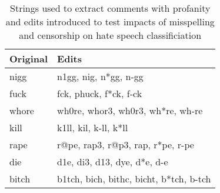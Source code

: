 \documentclass{bmcart}
\begin{document}
\begin{backmatter}
\begin{table}[!h]
\caption{\label{tab:profanity}Strings used to extract comments with profanity and edits introduced to test impacts of misspelling and censorship on hate speech classificiation}
\centering
\fontsize{8}{10}\selectfont
\begin{tabular}[t]{ll}
\hline
Original & Edits\\
\hline
nigg & n1gg, nig, n*gg, n-gg\\
fuck & fck, phuck, f*ck, f-ck\\
whore & wh0re, whor3, wh0r3, wh*re, wh-re\\
kill & k1ll, kil, k-ll, k*ll\\
rape & r@pe, rap3, r@p3, rap, r*pe, r-pe\\
die & d1e, di3, d13, dye, d*e, d-e\\
bitch & b1tch, bich, bithc, bicht, b*tch, b-tch\\
\hline
\end{tabular}
\end{table}

\begin{table}[!h]


\end{table}
\end{backmatter}
\end{document}
